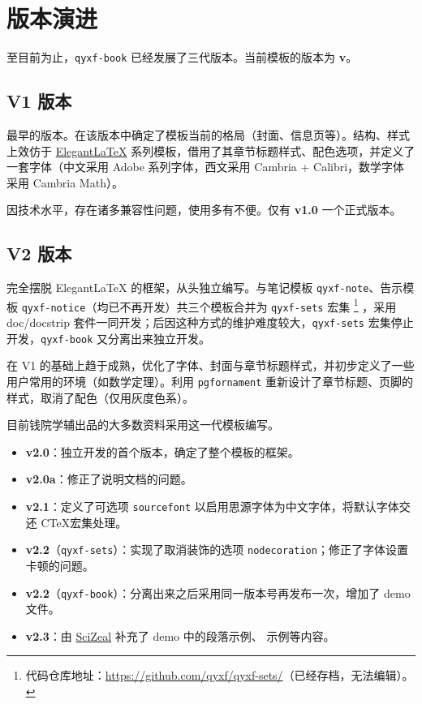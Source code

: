\documentclass[
  xits = false,
  10pt,
  twoside,
  openany,
  b5paper, %
  colorscheme = basic %
]{qyxf-book}
\begin{document}
\section{版本演进}

至目前为止，\verb|qyxf-book| 已经发展了三代版本。当前模板的版本为 \textbf{v\styversion}。

\subsection{V1 版本}
最早的版本。在该版本中确定了模板当前的格局（封面、信息页等）。结构、样式上效仿于 \href{https://elegantlatex.org/}{Elegant\LaTeX} 系列模板，借用了其章节标题样式、配色选项，并定义了一套字体（中文采用 Adobe 系列字体，西文采用 Cambria + Calibri，数学字体采用 Cambria Math）。

因技术水平，存在诸多兼容性问题，使用多有不便。仅有 \textbf{v1.0} 一个正式版本。

\subsection{V2 版本}

完全摆脱 Elegant\LaTeX{} 的框架，从头独立编写。与笔记模板 \verb|qyxf-note|、告示模板 \verb|qyxf-notice|（均已不再开发）共三个模板合并为 \verb|qyxf-sets| 宏集
\footnote{代码仓库地址：\url{https://github.com/qyxf/qyxf-sets/}（已经存档，无法编辑）。}
，采用 doc/docstrip 套件一同开发；后因这种方式的维护难度较大，\verb|qyxf-sets| 宏集停止开发，\verb|qyxf-book| 又分离出来独立开发。

在 V1 的基础上趋于成熟，优化了字体、封面与章节标题样式，并初步定义了一些用户常用的环境（如数学定理）。利用 \verb|pgfornament| 重新设计了章节标题、页脚的样式，取消了配色（仅用灰度色系）。

目前钱院学辅出品的大多数资料采用这一代模板编写。

\begin{itemize}
  \item \textbf{v2.0}：独立开发的首个版本，确定了整个模板的框架。
  \item \textbf{v2.0a}：修正了说明文档的问题。
  \item \textbf{v2.1}：定义了可选项 \verb|sourcefont| 以启用思源字体为中文字体，将默认字体交还 C\TeX 宏集处理。
  \item \textbf{v2.2}（\verb|qyxf-sets|）：实现了取消装饰的选项 \verb|nodecoration|；修正了字体设置卡顿的问题。
  \item \textbf{v2.2}（\verb|qyxf-book|）：分离出来之后采用同一版本号再发布一次，增加了 demo 文件。
  \item \textbf{v2.3}：由 \href{https://github.com/SciZeal}{SciZeal} 补充了 demo 中的段落示例、 示例等内容。
\end{itemize}
\end{document}
